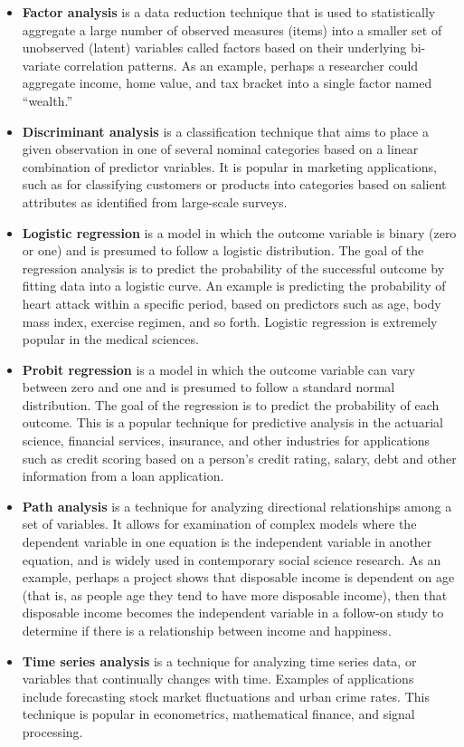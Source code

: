 \begin{itemize}
	\item \textbf{Factor analysis} is a data reduction technique that is used to statistically aggregate a large number of observed measures (items) into a smaller set of unobserved (latent) variables called factors based on their underlying bi-variate correlation patterns. As an example, perhaps a researcher could aggregate income, home value, and tax bracket into a single factor named ``wealth.''

	\item \textbf{Discriminant analysis} is a classification technique that aims to place a given observation in one of several nominal categories based on a linear combination of predictor variables. It is popular in marketing applications, such as for classifying customers or products into categories based on salient attributes as identified from large-scale surveys.

	\item \textbf{Logistic regression} is a model in which the outcome variable is binary (zero or one) and is presumed to follow a logistic distribution. The goal of the regression analysis is to predict the probability of the successful outcome by fitting data into a logistic curve. An example is predicting the probability of heart attack within a specific period, based on predictors such as age, body mass index, exercise regimen, and so forth. Logistic regression is extremely popular in the medical sciences. 

	\item \textbf{Probit regression} is a model in which the outcome variable can vary between zero and one and is presumed to follow a standard normal distribution. The goal of the regression is to predict the probability of each outcome. This is a popular technique for predictive analysis in the actuarial science, financial services, insurance, and other industries for applications such as credit scoring based on a person's credit rating, salary, debt and other information from a loan application.

	\item \textbf{Path analysis} is a technique for analyzing directional relationships among a set of variables. It allows for examination of complex models where the dependent variable in one equation is the independent variable in another equation, and is widely used in contemporary social science research. As an example, perhaps a project shows that disposable income is dependent on age (that is, as people age they tend to have more disposable income), then that disposable income becomes the independent variable in a follow-on study to determine if there is a relationship between income and happiness.

	\item \textbf{Time series analysis} is a technique for analyzing time series data, or variables that continually changes with time. Examples of applications include forecasting stock market fluctuations and urban crime rates. This technique is popular in econometrics, mathematical finance, and signal processing.
	
\end{itemize}

